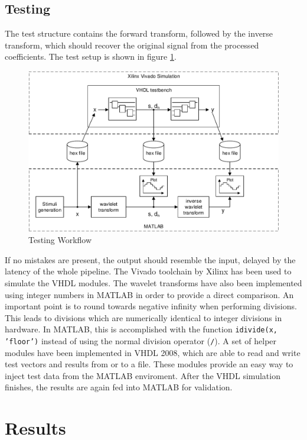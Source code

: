 \begin{refsection}
\subsection{Testing}

The test structure contains the forward transform, followed by the inverse transform, which should recover the original signal from the processed coefficients.
The test setup is shown in figure \ref{fpga:fig:testing}.
\begin{figure}
	\centering
	\includegraphics[width=\textwidth]{papers/fpga/images/vhdl_sim.pdf}
	\caption{Testing Workflow \label{fpga:fig:testing}}
\end{figure}
If no mistakes are present, the output should resemble the input, delayed by the latency of the whole pipeline.
The Vivado toolchain by Xilinx has been used to simulate the VHDL modules.
The wavelet transforms have also been implemented using integer numbers in MATLAB in order to provide a direct comparison.
An important point is to round towards negative infinity when performing divisions.
This leads to divisions which are numerically identical to integer divisions in hardware.
In MATLAB, this is accomplished with the function \texttt{idivide(x, 'floor')} instead of using the normal division operator (\texttt{/}).
A set of helper modules have been implemented in VHDL 2008, which are able to read and write test vectors and results from or to a file.
These modules provide an easy way to inject test data from the MATLAB enviroment.
After the VHDL simulation finishes, the results are again fed into MATLAB for validation.

\section{Results}


\end{refsection}
